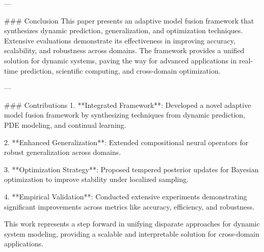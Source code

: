 ---

### Conclusion
This paper presents an adaptive model fusion framework that synthesizes dynamic prediction, generalization, and optimization techniques. Extensive evaluations demonstrate its effectiveness in improving accuracy, scalability, and robustness across domains. The framework provides a unified solution for dynamic systems, paving the way for advanced applications in real-time prediction, scientific computing, and cross-domain optimization.

---

### Contributions
1. **Integrated Framework**:
   Developed a novel adaptive model fusion framework by synthesizing techniques from dynamic prediction, PDE modeling, and continual learning.

2. **Enhanced Generalization**:
   Extended compositional neural operators for robust generalization across domains.

3. **Optimization Strategy**:
   Proposed tempered posterior updates for Bayesian optimization to improve stability under localized sampling.

4. **Empirical Validation**:
   Conducted extensive experiments demonstrating significant improvements across metrics like accuracy, efficiency, and robustness.

This work represents a step forward in unifying disparate approaches for dynamic system modeling, providing a scalable and interpretable solution for cross-domain applications.